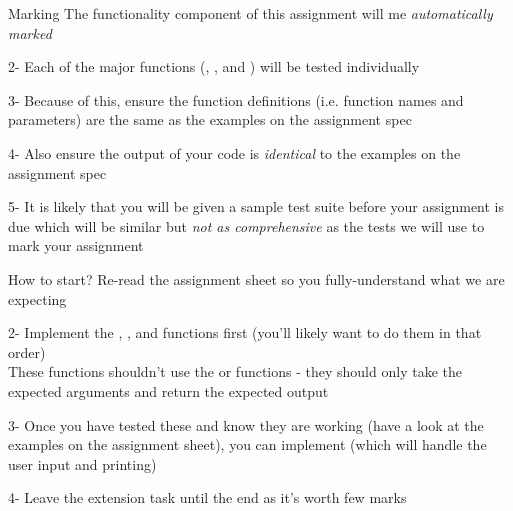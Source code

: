 \documentclass[week3]{csse1001}
\begin{document}
\begin{topic}{Marking}
The functionality component of this assignment will me \textit{automatically marked}

\begin{subtopic}{2-}
Each of the major functions (, ,  and ) will be tested individually
\end{subtopic}

\begin{subtopic}{3-}
Because of this, ensure the function definitions (i.e. function names and parameters) are the same as the examples on the assignment spec
\end{subtopic}

\begin{subtopic}{4-}
Also ensure the output of your code is \textit{identical} to the examples on the assignment spec
\end{subtopic}

\begin{subtopic}{5-}
It is likely that you will be given a sample test suite before your assignment is due which will be similar but \textit{not as comprehensive} as the tests we will use to mark your assignment
\end{subtopic}

\begin{topic}{How to start?}
Re-read the assignment sheet so you fully-understand what we are expecting

\begin{subtopic}{2-}
Implement the , , and  functions first (you'll likely want to do them in that order)\\
These functions shouldn't use the  or  functions - they should only take the expected arguments and return the expected output
\end{subtopic}

\begin{subtopic}{3-}
Once you have tested these and know they are working (have a look at the examples on the assignment sheet), you can implement  (which will handle the user input and printing)
\end{subtopic}

\begin{subtopic}{4-}
Leave the extension task until the end as it's worth few marks
\end{subtopic}


\end{topic}
\end{topic}
\end{document}
